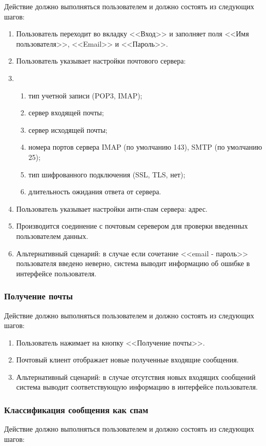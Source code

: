 Действие должно выполняться пользователем и должно состоять из следующих шагов:
\begin{enumerate}
  \item Пользователь переходит во вкладку <<Вход>> и заполняет поля <<Имя пользователя>>, <<Email>> и <<Пароль>>.
  \item Пользователь указывает настройки почтового сервера:
  \item 
    \begin{enumerate}
      \item тип учетной записи (POP3, IMAP);
      \item сервер входящей почты;
      \item сервер исходящей почты;
      \item номера портов сервера IMAP (по умолчанию 143), SMTP (по умолчанию 25);
      \item тип шифрованного подключения (SSL, TLS, нет);
      \item длительность ожидания ответа от сервера.
    \end{enumerate}
  \item Пользователь указывает настройки анти-спам сервера: адрес.
  \item Производится соединение с почтовым серевером для проверки введенных пользователем данных.
  \item Альтернативный сценарий: в случае если сочетание <<email - пароль>> пользователя введено неверно, система выводит информацию об ошибке в интерфейсе пользователя.
\end{enumerate}

\subsubsection{Получение почты}
Действие должно выполняться пользователем и должно состоять из следующих шагов:

\begin{enumerate}
  \item Пользователь нажимает на кнопку <<Получение почты>>.
  \item Почтовый клиент отображает новые полученные входящие сообщения.
  \item Альтернативный сценарий: в случае отсутствия новых входящих сообщений система выводит соответствующую информацию в интерфейсе пользователя.
\end{enumerate}

\subsubsection{Классификация сообщения как спам}
Действие должно выполняться пользователем и должно состоять из следующих шагов:

